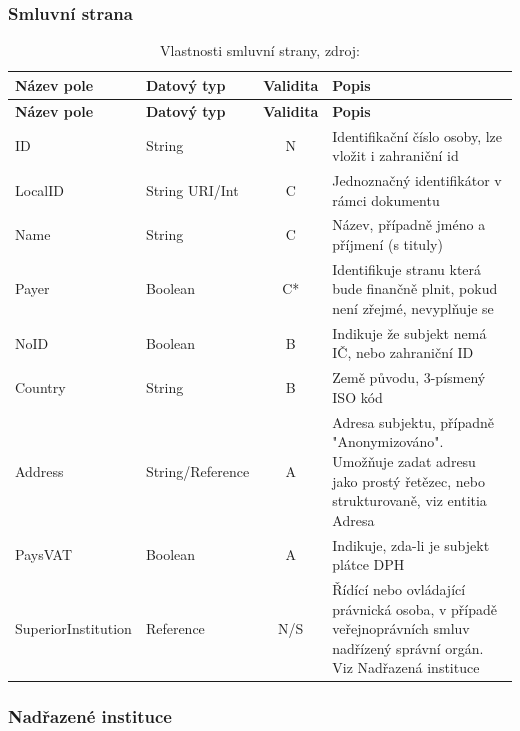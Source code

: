 \newpage

\subsubsection*{Smluvní strana}

\begin{center}
\begin{longtable}{lp{20mm}cp{65mm}}
\label{grid_mlmmh} \\
\multicolumn{1}{l}{\textbf{Název pole}} & 
\multicolumn{1}{l}{\textbf{Datový typ}} & 
\multicolumn{1}{l}{\textbf{Validita}} & 
\multicolumn{1}{l}{\textbf{Popis}} \\ \hline 
\endfirsthead
\multicolumn{1}{l}{\textbf{Název pole}} & 
\multicolumn{1}{l}{\textbf{Datový typ}} & 
\multicolumn{1}{l}{\textbf{Validita}} & 
\multicolumn{1}{l}{\textbf{Popis}} \\ \hline 
\hline
\endhead
\endfoot
\caption[Vlastnosti smluvní strany]{Vlastnosti smluvní strany, zdroj:\cite{metodika, standard}}
\endlastfoot
ID & String & N & Identifikační číslo osoby, lze vložit i zahraniční id \\
\rowcolor{validateC}LocalID & String URI/Int & C & Jednoznačný identifikátor v rámci dokumentu \\
\rowcolor{validateC}Name & String & C & Název, případně jméno a příjmení (s tituly) \\
\rowcolor{validateC}Payer & Boolean & C* & Identifikuje stranu která bude finančně plnit, pokud není zřejmé, nevyplňuje se \\
\rowcolor{validateB}NoID & Boolean & B & Indikuje že subjekt nemá IČ, nebo zahraniční ID \\
\rowcolor{validateB}Country & String & B & Země původu, 3-písmený ISO kód \\
\rowcolor{validateA}Address & String/Reference & A & Adresa subjektu, případně "Anonymizováno". Umožňuje zadat adresu jako prostý řetězec, nebo strukturovaně, viz entitia Adresa \\
\rowcolor{validateA}PaysVAT & Boolean & A & Indikuje, zda-li je subjekt plátce DPH \\
\rowcolor{validateS}SuperiorInstitution & Reference & N/S & Řídící nebo ovládající právnická osoba, v případě  veřejnoprávních smluv nadřízený správní orgán. Viz Nadřazená instituce \\
\end{longtable}
\end{center}

\subsubsection*{Nadřazené instituce}

